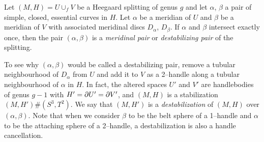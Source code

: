 \begin{defn}	
	Let $(M,H)=U\cup_f V$ be a Heegaard splitting of genus $g$ and let $\alpha$, $\beta$ a pair of simple, closed, essential curves in $H$.
	Let $\alpha$ be a meridian of $U$ and $\beta$ be a meridian of $V$ with associated meridinal discs $D_\alpha$, $D_\beta$.
	If $\alpha$ and $\beta$ intersect exactly once, then the pair $(\alpha,\beta)$ is a \emph{meridinal pair} or \emph{destabilizing pair} of the splitting.
\end{defn}

To see why $(\alpha,\beta)$ would be called a destabilizing pair, remove a tubular neighbourhood of $D_\alpha$ from $U$ and add it to $V$ as a 2--handle along a tubular neighbourhood of $\alpha$ in $H$.
In fact, the altered spaces $U'$ and $V'$ are handlebodies of genus $g-1$ with $H'= \partial U' = \partial V'$, and $(M,H)$ is a stabilization $(M,H')\#(S^3,T^2)$.
We say that $(M,H')$ is a \emph{destabilization} of $(M,H)$ over $(\alpha,\beta)$.
Note that when we consider $\beta$ to be the belt sphere of a 1--handle and $\alpha$ to be the attaching sphere of a 2--handle, a destabilization is also a handle cancellation.

%

